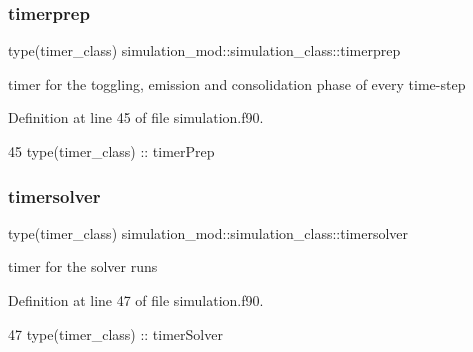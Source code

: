 \subsubsection{\texorpdfstring{timerprep}{timerprep}}
{\footnotesize\ttfamily type(timer\+\_\+class) simulation\+\_\+mod\+::simulation\+\_\+class\+::timerprep\hspace{0.3cm}{\ttfamily [private]}}



timer for the toggling, emission and consolidation phase of every time-\/step 



Definition at line 45 of file simulation.\+f90.


\begin{DoxyCode}
45         \textcolor{keywordtype}{type}(timer\_class) :: timerPrep
\end{DoxyCode}
\mbox{\label{structsimulation__mod_1_1simulation__class_a25e03717a6e87410b816ac1f299b282b}} 
\subsubsection{\texorpdfstring{timersolver}{timersolver}}
{\footnotesize\ttfamily type(timer\+\_\+class) simulation\+\_\+mod\+::simulation\+\_\+class\+::timersolver\hspace{0.3cm}{\ttfamily [private]}}



timer for the solver runs 



Definition at line 47 of file simulation.\+f90.


\begin{DoxyCode}
47         \textcolor{keywordtype}{type}(timer\_class) :: timerSolver
\end{DoxyCode}
\mbox{\label{structsimulation__mod_1_1simulation__class_ad43e06086299c6f9b4d37c90f81bca6c}} 
